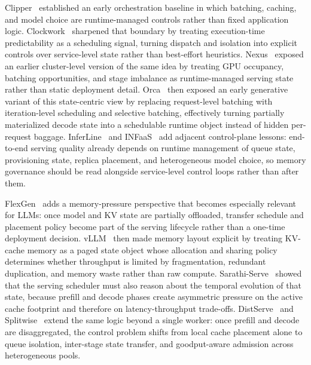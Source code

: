 \documentclass[acmsmall,screen,review]{acmart}
\begin{document}
Clipper~\cite{crankshaw2017clipper} established an early orchestration baseline in which batching, caching, and model choice are runtime-managed controls rather than fixed application logic. Clockwork~\cite{gujarati2020clockwork} sharpened that boundary by treating execution-time predictability as a scheduling signal, turning dispatch and isolation into explicit controls over service-level state rather than best-effort heuristics. Nexus~\cite{shen2019nexus} exposed an earlier cluster-level version of the same idea by treating GPU occupancy, batching opportunities, and stage imbalance as runtime-managed serving state rather than static deployment detail. Orca~\cite{yu2022orca} then exposed an early generative variant of this state-centric view by replacing request-level batching with iteration-level scheduling and selective batching, effectively turning partially materialized decode state into a schedulable runtime object instead of hidden per-request baggage. InferLine~\cite{crankshaw2020inferline} and INFaaS~\cite{romero2021infaas} add adjacent control-plane lessons: end-to-end serving quality already depends on runtime management of queue state, provisioning state, replica placement, and heterogeneous model choice, so memory governance should be read alongside service-level control loops rather than after them.

FlexGen~\cite{sheng2023flexgen} adds a memory-pressure perspective that becomes especially relevant for LLMs: once model and KV state are partially offloaded, transfer schedule and placement policy become part of the serving lifecycle rather than a one-time deployment decision. vLLM~\cite{kwon2023pagedattention} then made memory layout explicit by treating KV-cache memory as a paged state object whose allocation and sharing policy determines whether throughput is limited by fragmentation, redundant duplication, and memory waste rather than raw compute. Sarathi-Serve~\cite{agrawal2024sarathi} showed that the serving scheduler must also reason about the temporal evolution of that state, because prefill and decode phases create asymmetric pressure on the active cache footprint and therefore on latency-throughput trade-offs. DistServe~\cite{zhong2024distserve} and Splitwise~\cite{patel2024splitwise} extend the same logic beyond a single worker: once prefill and decode are disaggregated, the control problem shifts from local cache placement alone to queue isolation, inter-stage state transfer, and goodput-aware admission across heterogeneous pools.
\end{document}
